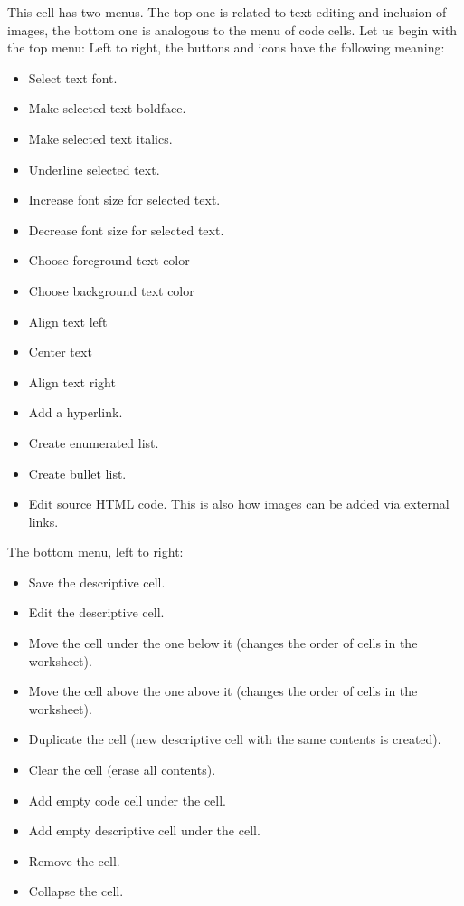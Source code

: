 \noindent
This cell has two menus. The top one is related to text editing and 
inclusion of images, the bottom one is analogous to the menu of 
code cells. Let us begin with the top menu:
Left to right, the buttons and icons have the following meaning: 
\begin{itemize}
\item Select text font. 
\item Make selected text boldface.
\item Make selected text italics.
\item Underline selected text.
\item Increase font size for selected text.
\item Decrease font size for selected text.
\item Choose foreground text color
\item Choose background text color
\item Align text left
\item Center text
\item Align text right 
\item Add a hyperlink.
\item Create enumerated list.
\item Create bullet list.
\item Edit source HTML code. This is also how images can be added via external links.
\end{itemize}
The bottom menu, left to right:
\begin{itemize}
\item Save the descriptive cell.
\item Edit the descriptive cell.
\item Move the cell under the one below it (changes the order of cells in the worksheet).
\item Move the cell above the one above it (changes the order of cells in the worksheet).
\item Duplicate the cell (new descriptive cell with the same contents is created).
\item Clear the cell (erase all contents).
\item Add empty code cell under the cell.
\item Add empty descriptive cell under the cell.
\item Remove the cell.
\item Collapse the cell. 
\end{itemize}



